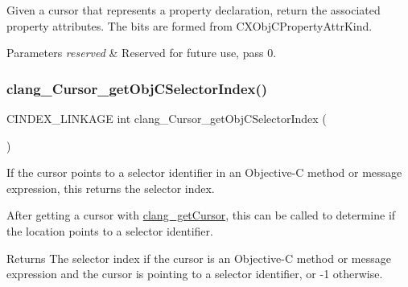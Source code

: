 Given a cursor that represents a property declaration, return the associated property attributes. The bits are formed from {\ttfamily C\+X\+Obj\+C\+Property\+Attr\+Kind}. 


\begin{DoxyParams}{Parameters}
{\em reserved} & Reserved for future use, pass 0. \\
\hline
\end{DoxyParams}
\mbox{\label{group__CINDEX__CURSOR__XREF_ga3ea92edf682a5a734e5f4d0c2217f0b8}} 
\subsubsection{\texorpdfstring{clang\+\_\+\+Cursor\+\_\+get\+Obj\+C\+Selector\+Index()}{clang\_Cursor\_getObjCSelectorIndex()}}
{\footnotesize\ttfamily C\+I\+N\+D\+E\+X\+\_\+\+L\+I\+N\+K\+A\+GE int clang\+\_\+\+Cursor\+\_\+get\+Obj\+C\+Selector\+Index (\begin{DoxyParamCaption}\item[{\hyperlink{structCXCursor}{C\+X\+Cursor}}]{ }\end{DoxyParamCaption})}



If the cursor points to a selector identifier in an Objective-\/C method or message expression, this returns the selector index. 

After getting a cursor with \hyperlink{group__CINDEX__CURSOR__SOURCE_ga30a9972c7e099ab2735fa6c45e247ec8}{clang\+\_\+get\+Cursor}, this can be called to determine if the location points to a selector identifier.

\begin{DoxyReturn}{Returns}
The selector index if the cursor is an Objective-\/C method or message expression and the cursor is pointing to a selector identifier, or -\/1 otherwise. 
\end{DoxyReturn}
\mbox{\label{group__CINDEX__CURSOR__XREF_ga251b31de80fd14681edf46f43b0bd03b}} 

